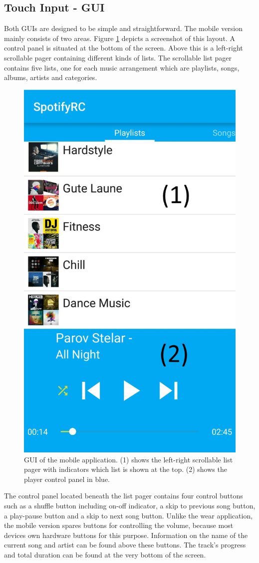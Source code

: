 \subsection{Touch Input - \ac{GUI}}
Both \ac{GUI}s are designed to be simple and straightforward. The mobile version mainly consists of two areas. Figure \ref{fig:mobileGUI} depicts a screenshot of this layout. A control panel is situated at the bottom of the screen. Above this is a left-right scrollable pager containing different kinds of lists.  The scrollable list pager contains five lists, one for each music arrangement which are playlists, songs, albums, artists and categories.
\begin{figure}[bth]
	\myfloatalign
	\includegraphics[width=.45\linewidth]{img/mobileGUIlabeled.png}
	\caption{\ac{GUI} of the mobile application. (1) shows the left-right scrollable list pager with indicators which list is shown at the top. (2) shows the player control panel in blue.}
	\label{fig:mobileGUI}
\end{figure}
The control panel located beneath the list pager contains four control buttons such as a shuffle button including on-off indicator, a skip to previous song button, a play-pause button and a skip to next song button. Unlike the wear application, the mobile version spares buttons for controlling the volume, because most devices own hardware buttons for this purpose. Information on the name of the current song and artist can be found above these buttons. The track's progress and total duration can be found at the very bottom of the screen. \\

